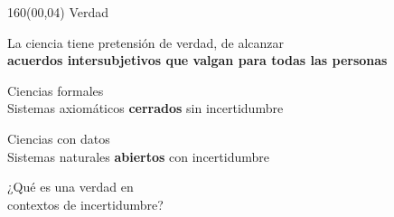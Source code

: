 \documentclass[shownotes,aspectratio=169]{beamer}
\begin{document}
\begin{frame}[plain]
\begin{textblock}{160}(00,04)
\centering
\LARGE Verdad
\end{textblock}
\vspace{1.3cm} \large

\centering

 La ciencia tiene pretensión de verdad, de alcanzar\\

\textbf{acuerdos intersubjetivos que valgan para todas las personas}

\vspace{0.7cm}

\pause

 \large Ciencias formales  \\
 \large  Sistemas axiomáticos \textbf{cerrados} sin incertidumbre\\

 \vspace{0.3cm}

  \pause

 \large Ciencias con datos  \\
\large Sistemas naturales \textbf{abiertos} con incertidumbre

\pause
\vspace{0.6cm}

\Large

¿Qué es una verdad en \\ contextos de incertidumbre?
%
%
%

\end{frame}
\end{document}
